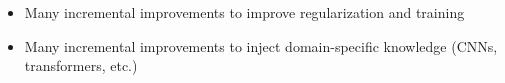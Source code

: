 \begin{frame}
    
    \begin{itemize}
        \vspace{0.5em}
        \item Many incremental improvements to improve regularization and training
        \vspace{0.5em}
        \item Many incremental improvements to inject domain-specific knowledge
            (CNNs, transformers, etc.)
    \end{itemize}

\end{frame}




